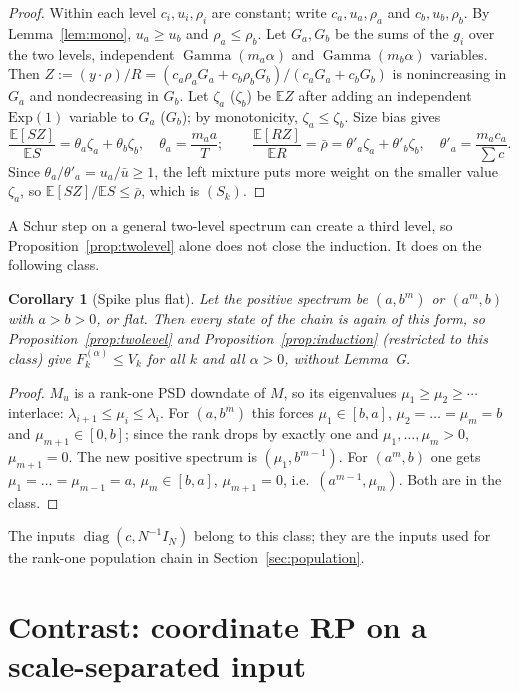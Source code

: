 \documentclass[11pt,a4paper]{article}
\newtheorem{corollary}[theorem]{Corollary}
\theoremstyle{definition}
\newcommand{\E}{\mathbb{E}}
\newcommand{\diag}{\operatorname{diag}}
\newcommand{\Gam}{\operatorname{Gamma}}
\begin{document}
\begin{proof}
Within each level $c_i,u_i,\rho_i$ are constant; write $c_a,u_a,\rho_a$ and $c_b,u_b,\rho_b$. By Lemma~\ref{lem:mono}, $u_a\ge u_b$ and $\rho_a\le\rho_b$. Let $G_a,G_b$ be the sums of the $g_i$ over the two levels, independent $\Gam(m_a\alpha)$ and $\Gam(m_b\alpha)$ variables. Then $Z:=(y\cdot\rho)/R=(c_a\rho_aG_a+c_b\rho_bG_b)/(c_aG_a+c_bG_b)$ is nonincreasing in $G_a$ and nondecreasing in $G_b$. Let $\zeta_a$ ($\zeta_b$) be $\E Z$ after adding an independent $\mathrm{Exp}(1)$ variable to $G_a$ ($G_b$); by monotonicity, $\zeta_a\le\zeta_b$. Size bias gives
\[
\frac{\E[SZ]}{\E S}=\theta_a\zeta_a+\theta_b\zeta_b,\quad \theta_a=\frac{m_aa}{T};\qquad \frac{\E[RZ]}{\E R}=\bar\rho=\theta'_a\zeta_a+\theta'_b\zeta_b,\quad \theta'_a=\frac{m_ac_a}{\sum c}.
\]
Since $\theta_a/\theta'_a=u_a/\bar u\ge1$, the left mixture puts more weight on the smaller value $\zeta_a$, so $\E[SZ]/\E S\le\bar\rho$, which is $(S_k)$.
\end{proof}

A Schur step on a general two-level spectrum can create a third level, so Proposition~\ref{prop:twolevel} alone does not close the induction. It does on the following class.

\begin{corollary}[Spike plus flat]\label{cor:spikeflat}
Let the positive spectrum be $(a,b^{m})$ or $(a^{m},b)$ with $a>b>0$, or flat. Then every state of the chain is again of this form, so Proposition~\ref{prop:twolevel} and Proposition~\ref{prop:induction} (restricted to this class) give $F^{(\alpha)}_k\le V_k$ for all $k$ and all $\alpha>0$, without Lemma~G.
\end{corollary}

\begin{proof}
$M_u$ is a rank-one PSD downdate of $M$, so its eigenvalues $\mu_1\ge\mu_2\ge\cdots$ interlace: $\lambda_{i+1}\le\mu_i\le\lambda_i$. For $(a,b^m)$ this forces $\mu_1\in[b,a]$, $\mu_2=\dots=\mu_m=b$ and $\mu_{m+1}\in[0,b]$; since the rank drops by exactly one and $\mu_1,\dots,\mu_m>0$, $\mu_{m+1}=0$. The new positive spectrum is $(\mu_1,b^{m-1})$. For $(a^m,b)$ one gets $\mu_1=\dots=\mu_{m-1}=a$, $\mu_m\in[b,a]$, $\mu_{m+1}=0$, i.e.\ $(a^{m-1},\mu_m)$. Both are in the class.
\end{proof}

The inputs $\diag(c,N^{-1}I_N)$ belong to this class; they are the inputs used for the rank-one population chain in Section~\ref{sec:population}.
\section{Contrast: coordinate RP on a scale-separated input}\label{sec:contrast}
\end{document}
